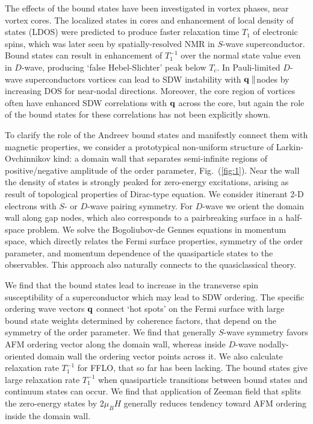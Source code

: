 \documentclass[prb,aps,showpacs,amsmath,twocolumn,10pt]{revtex4-1}
\begin{document}
The effects of the bound states have been investigated in vortex phases,
near vortex cores. The localized states in cores and 
enhancement of local density of states (LDOS) were
predicted\cite{Takigawa1999} to produce faster relaxation time $T_1$ of
electronic spins, which was later seen by spatially-resolved NMR in $S$-wave superconductor.\cite{Nakai2008} 
Bound states can result in enhancement of $T_1^{-1}$ over the normal state
value even in $D$-wave,\cite{Tanaka2015} producing 
`false Hebel-Slichter' peak below $T_c$. 
In Pauli-limited $D$-wave superconductors vortices can lead to SDW instability with ${\bf q}
\parallel $nodes by increasing DOS for near-nodal directions.\cite{sdw_vortex}
Moreover, the core region of vortices often have enhanced SDW 
correlations\cite{Ogata1999,JXZhu2001,Ghosal2002} with ${\bf q}$ across the
core, but again the role of the 
bound states for these correlations has not been explicitly shown. 

To clarify the role of the Andreev bound states and manifestly connect them with 
magnetic properties, we consider a prototypical non-uniform
structure of Larkin-Ovchinnikov kind: a domain wall that separates
semi-infinite regions of positive/negative amplitude of the order parameter, 
Fig.~(\ref{fig:1}).
Near the wall the density of states is
strongly peaked for zero-energy excitations, arising as result of topological
properties of Dirac-type equation.\cite{Tanaka2012,Mizushima2016} 
We consider itinerant 2-D electrons with $S$- or $D$-wave pairing symmetry. 
For $D$-wave we orient the domain wall along gap nodes,\cite{Vorontsov2005fflo} 
which also corresponds to a pairbreaking surface in a half-space problem. 
We solve the Bogoliubov-de Gennes equations in momentum space, which directly
relates the Fermi surface properties, symmetry of the order parameter, and
momentum dependence of the quasiparticle states 
to the observables. This approach also naturally connects to the quasiclassical theory. 

We find that the 
bound states lead to increase in the transverse spin susceptibility of
a superconductor 
which may lead to SDW ordering. 
The specific ordering wave vectors ${\bf q}$ connect `hot spots' on the Fermi surface
with large bound state weights determined by coherence factors, 
that depend on the symmetry of the order parameter. 
We find that generally $S$-wave symmetry favors AFM ordering vector along the
domain wall, whereas inside $D$-wave nodally-oriented domain wall the 
ordering vector points across it. 
We also calculate relaxation rate $T_1^{-1}$ for FFLO, that so far has been lacking. 
The bound states give large relaxation rate $T_1^{-1}$ 
when quasiparticle transitions between bound states 
and continuum states can occur. 
We find that application of Zeeman field that splits the zero-energy states by $2\mu_B H$ 
generally reduces tendency toward AFM ordering inside the domain wall. 
\end{document}
